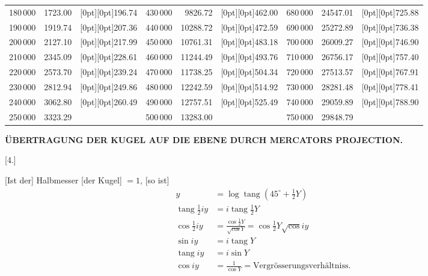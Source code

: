 {{\begin{tabular}{|r|r|r||r|r|r||r|r|r|}
180\,000 & 1723.00 & \raisebox{-6.7pt}[0pt][0pt]{196.74} & 430\,000 & 9826.72 & \raisebox{-6.7pt}[0pt][0pt]{462.00} & 680\,000 & 24547.01 & \raisebox{-6.7pt}[0pt][0pt]{725.88} \\
190\,000 & 1919.74 & \raisebox{-6.7pt}[0pt][0pt]{207.36} & 440\,000 & 10288.72 & \raisebox{-6.7pt}[0pt][0pt]{472.59} & 690\,000 & 25272.89 & \raisebox{-6.7pt}[0pt][0pt]{736.38} \\
200\,000 & 2127.10 & \raisebox{-6.7pt}[0pt][0pt]{217.99} & 450\,000 & 10761.31 & \raisebox{-6.7pt}[0pt][0pt]{483.18} & 700\,000 & 26009.27 & \raisebox{-6.7pt}[0pt][0pt]{746.90} \\
\cline{1-2}\cline{4-5}\cline{7-8}
210\,000 & 2345.09\llap{\raisebox{-.85ex}[0pt][0pt]{.}} & \raisebox{-6.7pt}[0pt][0pt]{228.61} & 460\,000 & 11244.49 & \raisebox{-6.7pt}[0pt][0pt]{493.76} & 710\,000 & 26756.17 & \raisebox{-6.7pt}[0pt][0pt]{757.40} \\
220\,000 & 2573.70 & \raisebox{-6.7pt}[0pt][0pt]{239.24} & 470\,000 & 11738.25 & \raisebox{-6.7pt}[0pt][0pt]{504.34} & 720\,000 & 27513.57 & \raisebox{-6.7pt}[0pt][0pt]{767.91} \\
230\,000 & 2812.94 & \raisebox{-6.7pt}[0pt][0pt]{249.86} & 480\,000 & 12242.59 & \raisebox{-6.7pt}[0pt][0pt]{514.92} & 730\,000 & 28281.48 & \raisebox{-6.7pt}[0pt][0pt]{778.41} \\
240\,000 & 3062.80 & \raisebox{-6.7pt}[0pt][0pt]{260.49} & 490\,000 & 12757.51 & \raisebox{-6.7pt}[0pt][0pt]{525.49} & 740\,000 & 29059.89 & \raisebox{-6.7pt}[0pt][0pt]{788.90} \\
250\,000 & 3323.29 &  & 500\,000 & 13283.00 &  & 750\,000 & 29848.79 &  \\
\end{tabular}%
}\par}
\par\clearpage
\noindent\null\hfill{\fontsize{8}{10}\selectfont\textbf{ÜBERTRAGUNG DER KUGEL AUF DIE EBENE DURCH MERCATORS PROJECTION.}}\hfill{}\par\medskip

\begin{center}[4.]\end{center}
[Ist der] Halbmesser [der Kugel] \(=1\), [so ist]
\[
\begin{aligned}
y&=\log\operatorname{tang}(45^\circ+\tfrac12Y)\\
\operatorname{tang}\tfrac12iy&=i\operatorname{tang}\tfrac12Y\\
\cos\tfrac12iy&=\frac{\cos\tfrac12Y}{\surd\cos Y}=\cos\tfrac12Y\surd\cos iy\\
\sin iy&=i\operatorname{tang}Y\\
\operatorname{tang}iy&=i\sin Y\\
\cos iy&=\frac1{\cos Y}=\text{Vergrösserungsverhältniss.}
\end{aligned}
\]


